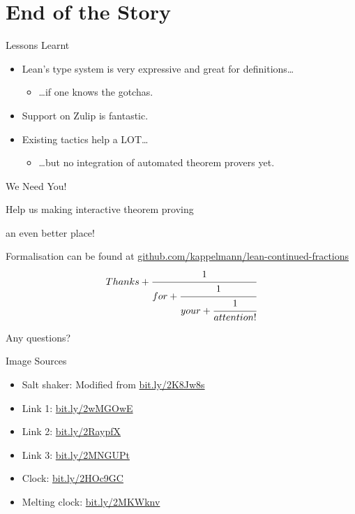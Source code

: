 \documentclass{beamer}
\begin{document}
\section{End of the Story}
\begin{frame}{Lessons Learnt}
\pause
\begin{itemize}[<+->]
\item Lean's type system is very expressive and great for definitions\dots
\begin{itemize}
\item \dots if one knows the gotchas.
\end{itemize}
\item Support on Zulip is fantastic.
\item Existing tactics help a LOT\dots
\begin{itemize}
\item \dots but no integration of automated theorem provers yet.
\end{itemize}
\end{itemize}
\end{frame}
\begin{frame}{We Need You!}
\Large
\centerline{\alert{Help us making interactive theorem proving}}

\centerline{\alert{an even better place!}}

\end{frame}
\begin{frame}[standout]
\normalsize{Formalisation can be found at \url{github.com/kappelmann/lean-continued-fractions}}
\pause
\center
\begin{equation*}
Thanks + \cfrac{1}{for + \cfrac{1}{your + \cfrac{1}{attention!}}}
\end{equation*}

\vspace{10mm}

\pause
\Large{\alert{Any questions?}}
\end{frame}

\begin{frame}[allowframebreaks]{Image Sources}
\begin{itemize}
\item Salt shaker: Modified from \url{bit.ly/2K8Jw8s}
\item Link 1: \url{bit.ly/2wMGOwE}
\item Link 2: \url{bit.ly/2RaypfX}
\item Link 3: \url{bit.ly/2MNGUPt}
\item Clock: \url{bit.ly/2HOc9GC}
\item Melting clock: \url{bit.ly/2MKWknv}
\end{itemize}
\end{frame}
\end{document}
